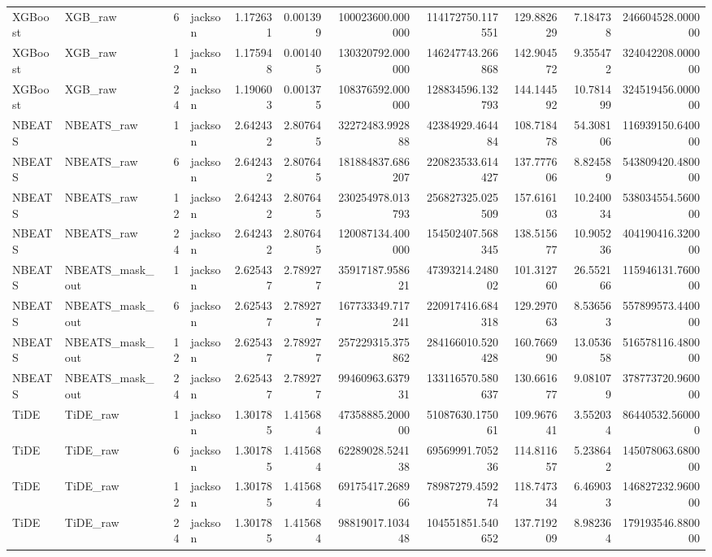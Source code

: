 \begin{longtable}{llrlrrrrrrr}
XGBoost & XGB\_raw & 6 & jackson & 1.172631 & 0.001399 & 100023600.000000 & 114172750.117551 & 129.882629 & 7.184738 & 246604528.000000 \\
XGBoost & XGB\_raw & 12 & jackson & 1.175948 & 0.001405 & 130320792.000000 & 146247743.266868 & 142.904572 & 9.355472 & 324042208.000000 \\
XGBoost & XGB\_raw & 24 & jackson & 1.190603 & 0.001375 & 108376592.000000 & 128834596.132793 & 144.144592 & 10.781499 & 324519456.000000 \\
NBEATS & NBEATS\_raw & 1 & jackson & 2.642432 & 2.807645 & 32272483.992888 & 42384929.464484 & 108.718478 & 54.308106 & 116939150.640000 \\
NBEATS & NBEATS\_raw & 6 & jackson & 2.642432 & 2.807645 & 181884837.686207 & 220823533.614427 & 137.777606 & 8.824589 & 543809420.480000 \\
NBEATS & NBEATS\_raw & 12 & jackson & 2.642432 & 2.807645 & 230254978.013793 & 256827325.025509 & 157.616103 & 10.240034 & 538034554.560000 \\
NBEATS & NBEATS\_raw & 24 & jackson & 2.642432 & 2.807645 & 120087134.400000 & 154502407.568345 & 138.515677 & 10.905236 & 404190416.320000 \\
NBEATS & NBEATS\_mask\_out & 1 & jackson & 2.625437 & 2.789277 & 35917187.958621 & 47393214.248002 & 101.312760 & 26.552166 & 115946131.760000 \\
NBEATS & NBEATS\_mask\_out & 6 & jackson & 2.625437 & 2.789277 & 167733349.717241 & 220917416.684318 & 129.297063 & 8.536563 & 557899573.440000 \\
NBEATS & NBEATS\_mask\_out & 12 & jackson & 2.625437 & 2.789277 & 257229315.375862 & 284166010.520428 & 160.766990 & 13.053658 & 516578116.480000 \\
NBEATS & NBEATS\_mask\_out & 24 & jackson & 2.625437 & 2.789277 & 99460963.637931 & 133116570.580637 & 130.661677 & 9.081079 & 378773720.960000 \\
TiDE & TiDE\_raw & 1 & jackson & 1.301785 & 1.415684 & 47358885.200000 & 51087630.175061 & 109.967641 & 3.552034 & 86440532.560000 \\
TiDE & TiDE\_raw & 6 & jackson & 1.301785 & 1.415684 & 62289028.524138 & 69569991.705236 & 114.811657 & 5.238642 & 145078063.680000 \\
TiDE & TiDE\_raw & 12 & jackson & 1.301785 & 1.415684 & 69175417.268966 & 78987279.459274 & 118.747334 & 6.469033 & 146827232.960000 \\
TiDE & TiDE\_raw & 24 & jackson & 1.301785 & 1.415684 & 98819017.103448 & 104551851.540652 & 137.719209 & 8.982364 & 179193546.880000 \\

\end{longtable}

